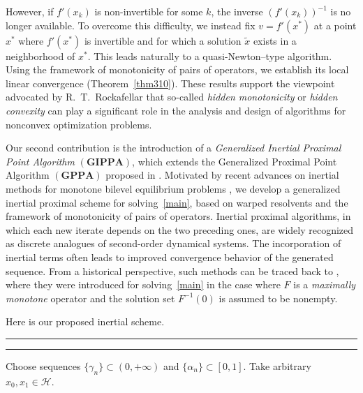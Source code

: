 \documentclass[11pt]{article}
\theoremstyle{definition}
\theoremstyle{definition}
\theoremstyle{definition}
\begin{document}
{However, if \(f'(x_k)\) is non-invertible for some \(k\), the inverse \((f'(x_k))^{-1}\) is no longer available. To overcome this difficulty, we instead fix \(v=f'(x^*)\) at a point \(x^*\) where \(f'(x^*)\) is invertible and for which a solution \(\tilde{x}\) exists in a neighborhood of \(x^*\). This leads naturally to a quasi-Newton--type algorithm. Using the framework of monotonicity of pairs of operators, we establish its local linear convergence (Theorem~\ref{thm310}).
These results support the viewpoint advocated by R.~T.~Rockafellar \cite{Rockafellar1970,Rockafellar2019,Rockafellar2023} that so-called \emph{hidden monotonicity} or \emph{hidden convexity} can play a significant role in the analysis and design of algorithms for nonconvex optimization problems.
}

{
Our second contribution is the introduction of a \emph{Generalized Inertial Proximal Point Algorithm}  \((\mathbf{GIPPA})\),  which extends the Generalized Proximal Point Algorithm \((\mathbf{GPPA})\) proposed in \cite{LDT}. Motivated by recent advances on inertial methods for monotone bilevel equilibrium problems \cite{balhag2022weak,balhag2022weak1}, we develop a generalized inertial proximal scheme for solving~\eqref{main}, based on warped resolvents and the framework of monotonicity of pairs of operators.}
{Inertial proximal algorithms, in which each new iterate depends on the two preceding ones, are widely recognized as discrete analogues of second-order dynamical systems. The incorporation of inertial terms often leads to improved convergence behavior of the generated sequence. From a historical perspective, such methods can be traced back to \cite{AA}, where they were introduced for solving~\eqref{main} in the case where \(F\) is a \emph{maximally monotone} operator and the solution set \(F^{-1}(0)\) is assumed to be nonempty.
}

\smallskip
Here is our proposed inertial scheme.  

\smallskip
\hrule
\vspace{2mm}
\vspace{2mm}
\hrule
\vspace{2mm}
 Choose sequences \(\{\gamma_n\}\subset (0,+\infty)\) and \(\{\alpha_n\}\subset [0,1]\). Take arbitrary \(x_0, x_1 \in \mathcal{H}\).  


\medskip 
\end{document}
